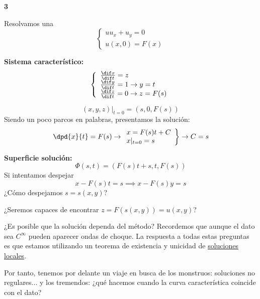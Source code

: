 	\begin{example}{\bf 3}

		Resolvamos una 
		\[
			\left\{
			\begin{array}{l}
				uu_x + u_y = 0 \\
				u(x,0) = F(x)
			\end{array}
			\right.
		\]

		\textbf{Sistema característico:}
		\[
			\left\{
			\begin{array}{l}
				\frac{\dif x}{\dif t} = z \\
				\frac{\dif y}{\dif t} = 1 \rightarrow y = t \\
				\frac{\dif z}{\dif t} = 0 \rightarrow z = F(s) \\
			\end{array}
			\right.
		\]

		$$(x,y,z) |_{t=0} = (s,0,F(s))$$
		Siendo un poco parcos en palabras, presentamos la solución:
		\[
			\left.
			\dpd{x}{t} = F(s) \rightarrow \\
			\begin{array}{l}
				x = F(s)t + C \\
				x |_{t=0} = s
			\end{array}
			\right\} \rightarrow C = s
		\]

		\textbf{Superficie solución:}
		$$\Phi(s,t) = (F(s) t + s, t , F(s))$$
		Si intentamos despejar
		$$x - F(s)t = s \implies x-F(s)y = s$$
		¿Cómo despejamos $s = s(x,y)$?

		\noindent¿Seremos capaces de encontrar $z = F(s(x,y)) = u(x,y)$?


		\noindent¿Es posible que la solución dependa del método? Recordemos que aunque el dato sea $C^\infty$ pueden aparecer ondas de choque. La respuesta a todas estas preguntas es que estamos utilizando un teorema de existencia y unicidad de \underline{soluciones locales}.

		\noindent Por tanto, tenemos por delante un viaje en busca de los monstruos: soluciones no regulares... y los tremendos: ¿qué hacemos cuando la curva característica coincide con el dato?

	\end{example}


